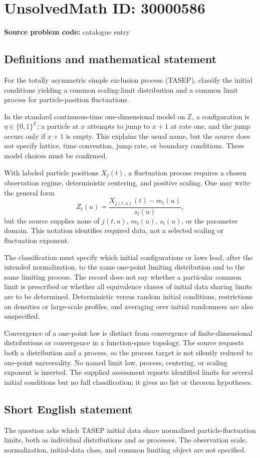 \documentclass[11pt]{article}
\newcommand{\Z}{\mathbb{Z}}
\begin{document}
\section*{UnsolvedMath ID: 30000586}
\textbf{Source problem code:} catalogue entry
\subsection{Definitions and mathematical statement}
For the totally asymmetric simple exclusion process (TASEP), classify the initial conditions yielding a common scaling-limit distribution and a common limit process for particle-position fluctuations.

In the standard continuous-time one-dimensional model on $\Z$, a configuration is $\eta\in\{0,1\}^{\Z}$; a particle at $x$ attempts to jump to $x+1$ at rate one, and the jump occurs only if $x+1$ is empty. This explains the usual name, but the source does not specify lattice, time convention, jump rate, or boundary conditions. These model choices must be confirmed.

With labeled particle positions $X_j(t)$, a fluctuation process requires a chosen observation regime, deterministic centering, and positive scaling. One may write the general form
\[
 Z_t(u)=\frac{X_{j(t,u)}(t)-m_t(u)}{s_t(u)},
\]
but the source supplies none of $j(t,u)$, $m_t(u)$, $s_t(u)$, or the parameter domain. This notation identifies required data, not a selected scaling or fluctuation exponent.

The classification must specify which initial configurations or laws lead, after the intended normalization, to the same one-point limiting distribution and to the same limiting process. The record does not say whether a particular common limit is prescribed or whether all equivalence classes of initial data sharing limits are to be determined. Deterministic versus random initial conditions, restrictions on densities or large-scale profiles, and averaging over initial randomness are also unspecified.

Convergence of a one-point law is distinct from convergence of finite-dimensional distributions or convergence in a function-space topology. The source requests both a distribution and a process, so the process target is not silently reduced to one-point universality. No named limit law, process, centering, or scaling exponent is inserted. The supplied assessment reports identified limits for several initial conditions but no full classification; it gives no list or theorem hypotheses.
\subsection{Short English statement}
The question asks which TASEP initial data share normalized particle-fluctuation limits, both as individual distributions and as processes. The observation scale, normalization, initial-data class, and common limiting object are not specified.
\end{document}
